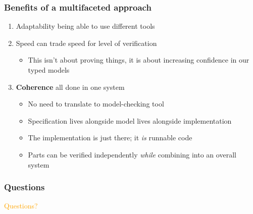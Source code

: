 \documentclass[compress,handout]{beamer}
\begin{document}
\begin{frame}
  \frametitle{Benefits of a multifaceted approach}

  \begin{enumerate}
    \item<1-> Adaptability {\textemdash} being able to use different tools
    \item<2-> Speed {\textemdash} can trade speed for level of verification
    \begin{itemize}
      \item<2-> This isn't about proving things, it is about increasing
                confidence in our typed models
    \end{itemize}
    \item<3-> \textbf{Coherence} {\textemdash} all done in one system
      \begin{itemize}
        \item<4-> No need to translate to model-checking tool
        \item<5-> Specification lives alongside model lives alongside
                  implementation
        \item<6-> The implementation is just there; it \emph{is} runnable code
        \item<7-> Parts can be verified independently \emph{while} combining into an
                  overall system
      \end{itemize}
  \end{enumerate}

\end{frame}




\begin{frame}
  \frametitle{Questions}

  \begin{center}
    \textcolor<1>{orange}{\Large Questions?}
  \end{center}

\end{frame}
\end{document}
